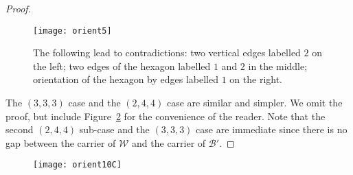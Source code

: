 \documentclass[11pt]{amsart}
\newcommand {\h}{\mathcal H}
\newcommand {\W}{\mathcal W}
\newtheorem{lemma}[theorem]{Lemma}
\theoremstyle{definition}
\begin{document}
\begin{proof}
\begin{figure}[h!]
	\centering
	\texttt{[image: orient5]}
	\caption{The following lead to contradictions: two vertical edges labelled $2$ on the left; two edges of the hexagon labelled $1$ and $2$ in the middle; orientation of the hexagon by edges labelled $1$ on the right. 
	}
	\label{f:orient5}
\end{figure}

The $(3,3,3)$ case and the $(2,4,4)$ case are similar and simpler. We omit the proof, but include Figure~\ref{f:orient10} for the convenience of the reader. Note that the second $(2,4,4)$ sub-case and the $(3,3,3)$ case are immediate since there is no gap between the carrier of $\mathcal{W}$ and the carrier of $\mathcal{B}'$.
\end{proof}
\begin{figure}[h!]
	\centering
	\texttt{[image: orient10C]}
	\caption{}
	\label{f:orient10}
\end{figure}



\end{document}
